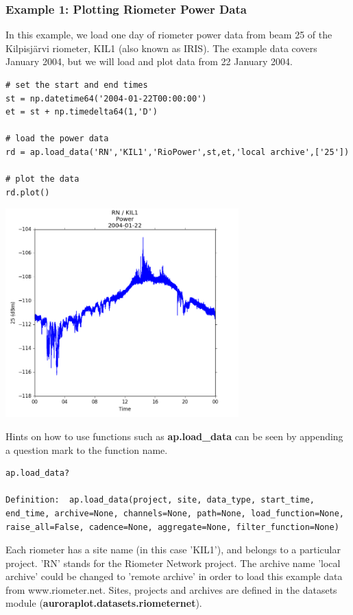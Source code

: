\documentclass{article}
\begin{document}
\subsubsection{Example 1: Plotting Riometer Power Data}

In this example, we load one day of riometer power data from beam 25 of the Kilpisj\"arvi riometer, KIL1 (also known as IRIS). The example data covers January 2004, but we will load and plot data from 22 January 2004.

\begin{lstlisting}[style=pythonstyle]
# set the start and end times
st = np.datetime64('2004-01-22T00:00:00')
et = st + np.timedelta64(1,'D')

# load the power data
rd = ap.load_data('RN','KIL1','RioPower',st,et,'local archive',['25'])

# plot the data
rd.plot()
\end{lstlisting}

\begin{center}
\includegraphics[width=9cm]{images/figure_1.png}
\end{center}

\noindent Hints on how to use functions such as {\bf ap.load\_data} can be seen by appending a question mark to the function name.

\begin{lstlisting}[style=pythonstyle]
ap.load_data?

Definition:  ap.load_data(project, site, data_type, start_time, end_time, archive=None, channels=None, path=None, load_function=None, raise_all=False, cadence=None, aggregate=None, filter_function=None)
\end{lstlisting}

Each riometer has a site name (in this case 'KIL1'), and belongs to a particular project. 'RN' stands for the Riometer Network project. The archive name 'local archive' could be changed to 'remote archive' in order to load this example data from www.riometer.net. Sites, projects and archives are defined in the datasets module ({\bf auroraplot.datasets.riometernet}).
\end{document}
